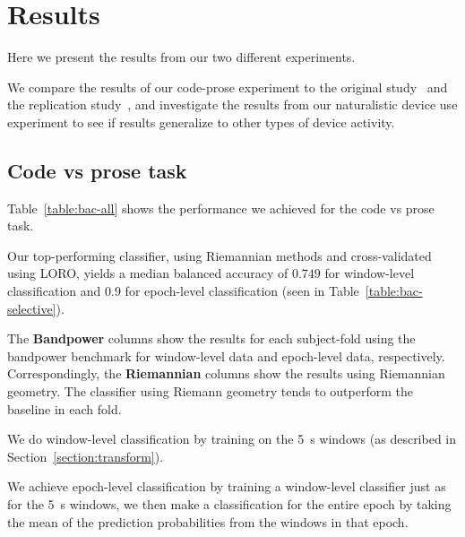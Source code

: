 \chapter{Results}\label{section:results}

    Here we present the results from our two different experiments.

    We compare the results of our code-prose experiment to the original study~\cite{floyd_decoding_2017} and the replication study~\cite{fucci_replication_2019}, and investigate the results from our naturalistic device use experiment to see if results generalize to other types of device activity.

    \section{Code vs prose task}
        Table~\ref{table:bac-all} shows the performance we achieved for the code vs prose task.

        Our top-performing classifier, using Riemannian methods and cross-validated using LORO, yields a median balanced accuracy of $0.749$  for window-level classification and $0.9$ for epoch-level classification (seen in Table~\ref{table:bac-selective}).

        The \textbf{Bandpower} columns show the results for each subject-fold using the bandpower benchmark for window-level data and epoch-level data, respectively. Correspondingly, the \textbf{Riemannian} columns show the results using Riemannian geometry. The classifier using Riemann geometry tends to outperform the baseline in each fold.

        We do window-level classification by training on the \SI{5}{\second} windows (as described in Section~\ref{section:transform}).

        We achieve epoch-level classification by training a window-level classifier just as for the \SI{5}{\second} windows, we then make a classification for the entire epoch by taking the mean of the prediction probabilities from the windows in that epoch.

